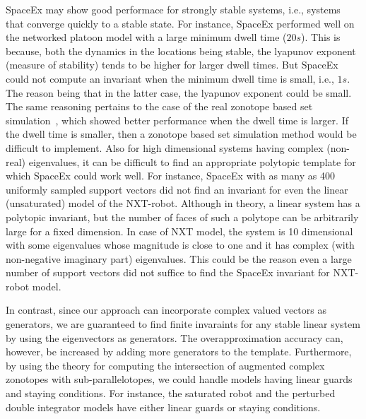 SpaceEx may show good performace for strongly stable systems, i.e.,
systems that converge quickly to a stable state.  For instance,
SpaceEx performed well on the networked platoon model with a large
minimum dwell time ($20s$).  This is because, both the dynamics in the
locations being stable, the lyapunov exponent (measure of stability)
tends to be higher for larger dwell times.  But SpaceEx could not
compute an invariant when the minimum dwell time is small, i.e., $1s$.
The reason being that in the latter case, the lyapunov exponent could
be small.  The same reasoning pertains to the case of the real
zonotope based set simulation~\cite{makhlouf2014networked}, which
showed better performance when the dwell time is larger.  If the dwell
time is smaller, then a zonotope based set simulation method would be
difficult to implement.  Also for high dimensional systems having
complex (non-real) eigenvalues, it can be difficult to find an
appropriate polytopic template for which SpaceEx could work well.  For
instance, SpaceEx with as many as 400 uniformly sampled support
vectors did not find an invariant for even the linear (unsaturated)
model of the NXT-robot.  Although in theory, a linear system has a
polytopic invariant, but the number of faces of such a polytope can be
arbitrarily large for a fixed dimension.  In case of NXT model, the
system is 10 dimensional with some eigenvalues whose magnitude is
close to one and it has complex (with non-negative imaginary part)
eigenvalues.  This could be the reason even a large number of support
vectors did not suffice to find the SpaceEx invariant for NXT-robot
model.


In contrast, since our approach can incorporate complex valued vectors
as generators, we are guaranteed to find finite invaraints for any
stable linear system by using the eigenvectors as generators.  The
overapproximation accuracy can, however, be increased by adding more
generators to the template.  Furthermore, by using the theory for
computing the intersection of augmented complex zonotopes with
sub-parallelotopes, we could handle models having linear guards and
staying conditions.  For instance, the saturated robot and the
perturbed double integrator models have either linear guards or
staying conditions.





